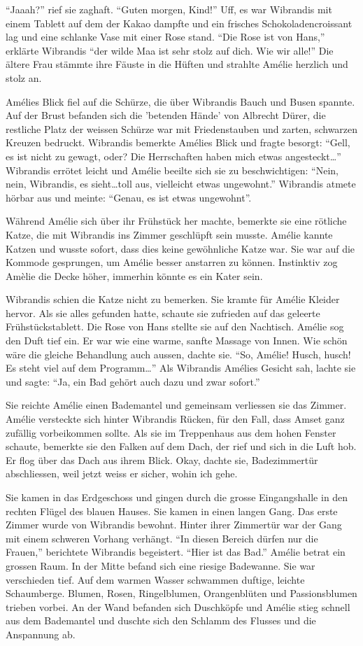 \documentclass[11pt,titlepage,a5paper]{book}
\begin{document}
"`Jaaah?"' rief sie zaghaft. "`Guten morgen, Kind!"' Uff, es war Wibrandis mit einem Tablett auf dem der Kakao dampfte und ein frisches Schokoladencroissant lag und eine schlanke Vase mit einer Rose stand. "`Die Rose ist von Hans,"' erklärte Wibrandis "`der wilde Maa ist sehr stolz auf dich. Wie wir alle!"' Die ältere Frau stämmte ihre Fäuste in die Hüften und strahlte Amélie herzlich und stolz an.

Amélies Blick fiel auf die Schürze, die über Wibrandis Bauch und Busen spannte. Auf der Brust befanden sich die 'betenden Hände' von Albrecht Dürer, die restliche Platz der weissen Schürze war mit Friedenstauben und zarten, schwarzen Kreuzen bedruckt. Wibrandis bemerkte Amélies Blick und fragte besorgt: "`Gell, es ist nicht zu gewagt, oder? Die Herrschaften haben mich etwas angesteckt\dots"' Wibrandis errötet leicht und Amélie beeilte sich sie zu beschwichtigen: "`Nein, nein, Wibrandis, es sieht\dots toll aus, vielleicht etwas ungewohnt."' Wibrandis atmete hörbar aus und meinte: "`Genau, es ist etwas ungewohnt"'.

Während Amélie sich über ihr Frühstück her machte, bemerkte sie eine rötliche Katze, die mit Wibrandis ins Zimmer geschlüpft sein musste. Amélie kannte Katzen und wusste sofort, dass dies keine gewöhnliche Katze war. Sie war auf die Kommode gesprungen, um Amélie besser anstarren zu können. Instinktiv zog Amèlie die Decke höher, immerhin könnte es ein Kater sein.

Wibrandis schien die Katze nicht zu bemerken. Sie kramte für Amélie Kleider hervor. Als sie alles gefunden hatte, schaute sie zufrieden auf das geleerte Frühstückstablett. Die Rose von Hans stellte sie auf den Nachtisch. Amélie sog den Duft tief ein. Er war wie eine warme, sanfte Massage von Innen. Wie schön wäre die gleiche Behandlung auch aussen, dachte sie. "`So, Amélie! Husch, husch! Es steht viel auf dem Programm\dots"' Als Wibrandis Amélies Gesicht sah, lachte sie und sagte: "`Ja, ein Bad gehört auch dazu und zwar sofort."'

Sie reichte Amélie einen Bademantel und gemeinsam verliessen sie das Zimmer. Amélie versteckte sich hinter Wibrandis Rücken, für den Fall, dass Amset ganz zufällig vorbeikommen sollte. Als sie im Treppenhaus aus dem hohen Fenster schaute, bemerkte sie den Falken auf dem Dach, der rief und sich in die Luft hob. Er flog über das Dach aus ihrem Blick. Okay, dachte sie, Badezimmertür abschliessen, weil jetzt weiss er sicher, wohin ich gehe.

Sie kamen in das Erdgeschoss und gingen durch die grosse Eingangshalle in den rechten Flügel des blauen Hauses. Sie kamen in einen langen Gang. Das erste Zimmer wurde von Wibrandis bewohnt. Hinter ihrer Zimmertür war der Gang mit einem schweren Vorhang verhängt. "`In diesen Bereich dürfen nur die Frauen,"' berichtete Wibrandis begeistert. "`Hier ist das Bad."' Amélie betrat ein grossen Raum. In der Mitte befand sich eine riesige Badewanne. Sie war verschieden tief. Auf dem warmen  Wasser schwammen duftige, leichte Schaumberge. Blumen, Rosen, Ringelblumen, Orangenblüten und Passionsblumen trieben vorbei. An der Wand befanden sich Duschköpfe und Amélie stieg schnell aus dem Bademantel und duschte sich den Schlamm des Flusses und die Anspannung ab. 
\end{document}
